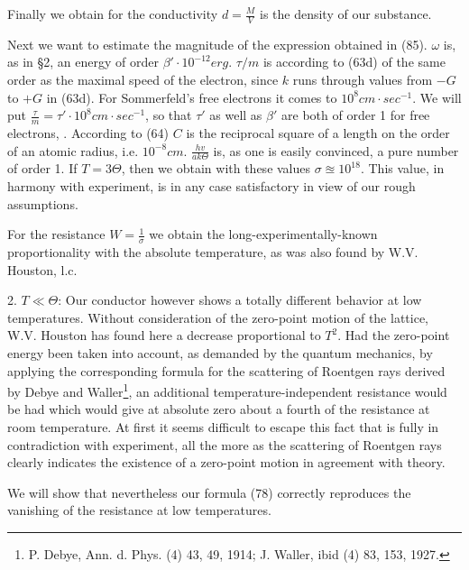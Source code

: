 \begin{paper}{1}
Finally we obtain for the conductivity
$d=\frac{M}{V}$ is the density of our substance.

Next we want to estimate the magnitude of the expression obtained in (85). $\omega$ is, as in \S2, an energy of order $\beta'\cdot 10^{-12}\unit{erg}$. $\tau/m$ is according to (63d) of the same order as the maximal speed of the electron, since $k$ runs through values from $-G$ to $+G$ in (63d). For Sommerfeld's free electrons it comes to $10^8\unit{cm}\cdot\unit{sec}^{-1}$. We will put $\frac{\tau}{m}=\tau'\cdot 10^8\unit{cm}\cdot\unit{sec}^{-1}$, so that $\tau'$ as well as $\beta'$ are both of order 1 for free electrons, . According to (64) $C$ is the reciprocal square of a length on the order of an atomic radius, i.e. $10^{-8}\unit{cm}$. $\frac{hv}{ak\Theta}$ is, as one is easily convinced, a pure number of order 1. If $T=3\Theta$, then we obtain with these values $\sigma \approxeq 10^{18}$. This value, in harmony with experiment, is in any case satisfactory in view of our rough assumptions.

For the resistance $W=\frac{1}{\sigma}$ we obtain the long-experimentally-known proportionality with the absolute temperature, as was also found by W.V. Houston, l.c.

2. $T\ll\Theta$: Our conductor however shows a totally different behavior at low temperatures. Without consideration of the zero-point motion of the lattice, W.V. Houston has found here a decrease proportional to $T^2$. Had the zero-point energy been taken into account, as demanded by the quantum mechanics, by applying the corresponding formula for the scattering of Roentgen rays derived by Debye and Waller\footnote{P. Debye, Ann. d. Phys. (4) 43, 49, 1914; J. Waller, ibid (4) 83, 153, 1927.}, an additional temperature-independent resistance would be had which would give at absolute zero about a fourth of the resistance at room temperature. At first it seems difficult to escape this fact that is fully in contradiction with experiment, all the more as the scattering of Roentgen rays clearly indicates the existence of a zero-point motion in agreement with theory.

We will show that nevertheless our formula (78) correctly reproduces the vanishing of the resistance at low temperatures.


\end{paper}
